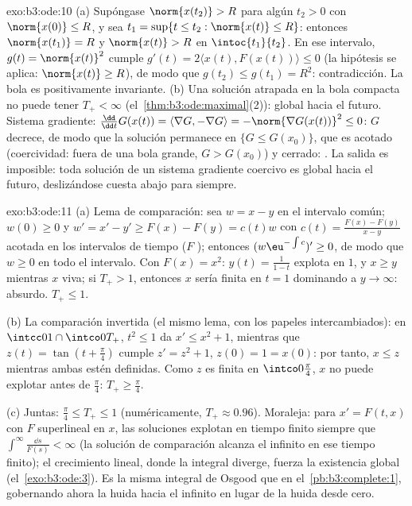 \begin{solution}{exo:b3:ode:10}
(a) Supóngase $\norm{x(t_2)} > R$ para algún $t_2 > 0$ con
$\norm{x(0)} \leq R$, y sea $t_1 = \sup\{t \leq t_2 :
\norm{x(t)} \leq R\}$: entonces $\norm{x(t_1)} = R$ y $\norm{x(t)} > R$
en $\intoc{t_1}{t_2}$. En ese intervalo, $g(t) = \norm{x(t)}^2$ cumple
$g'(t) = 2\langle x(t),
F(x(t))\rangle \leq 0$ (la hipótesis se aplica: $\norm{x(t)}
\geq R$), de modo que $g(t_2) \leq g(t_1) = R^2$: contradicción. La bola
es positivamente invariante. (b) Una solución atrapada en la bola
compacta no puede tener $T_+ < \infty$
(el~\cref{thm:b3:ode:maximal}(2)): global hacia el futuro. Sistema
gradiente: $\frac{\dd}{\dd t}G(x(t)) =
\langle\nabla G, -\nabla G\rangle = -\norm{\nabla G(x(t))}^2
\leq 0$: $G$ decrece, de modo que la solución permanece en $\{G \leq
G(x_0)\}$, que es acotado (coercividad: fuera de una bola grande,
$G > G(x_0)$) y cerrado: . La
salida es imposible: toda solución de un sistema gradiente coercivo es
global hacia el futuro, deslizándose cuesta abajo para siempre.
\end{solution}

\begin{solution}{exo:b3:ode:11}
(a) Lema de comparación: sea $w = x - y$ en el intervalo común;
$w(0) \geq 0$ y $w' = x' - y' \geq F(x) - F(y) =
c(t)w$ con $c(t) = \frac{F(x) - F(y)}{x - y}$ acotada en los intervalos
de tiempo  ($F$
); entonces
$(w\eu^{-\int c})' \geq 0$, de modo que $w \geq 0$ en todo el intervalo.
Con $F(x) = x^2$: $y(t) = \frac1{1 - t}$ explota en $1$, y $x
\geq y$ mientras $x$ viva; si $T_+ > 1$, entonces $x$ sería finita en
$t = 1$ dominando a $y \to \infty$: absurdo. $T_+ \leq 1$.

(b) La comparación invertida (el mismo lema, con los papeles
intercambiados): en $\intcc01\cap\intco0{T_+}$, $t^2 \leq 1$ da $x' \leq
x^2 + 1$, mientras que $z(t) = \tan(t + \frac\pi4)$ cumple $z' =
z^2 + 1$, $z(0) = 1 = x(0)$: por tanto, $x \leq z$ mientras ambas estén
definidas. Como $z$ es finita en $\intco0{\frac\pi4}$, $x$ no puede
explotar antes de
$\frac\pi4$: $T_+ \geq \frac\pi4$.

(c) Juntas: $\frac\pi4 \leq T_+ \leq 1$ (numéricamente, $T_+
\approx 0.96$). Moraleja: para $x' = F(t, x)$ con $F$ superlineal en
$x$, las soluciones explotan en tiempo finito siempre que
$\int^\infty\frac{\dd s}{F(s)} < \infty$ (la solución de comparación
alcanza el infinito en ese tiempo finito); el crecimiento lineal, donde
la integral diverge, fuerza la existencia global
(el~\cref{exo:b3:ode:3}). Es la misma integral de Osgood que en
el~\cref{pb:b3:complete:1}, gobernando ahora la huida hacia el infinito
en lugar de la huida desde cero.
\end{solution}

